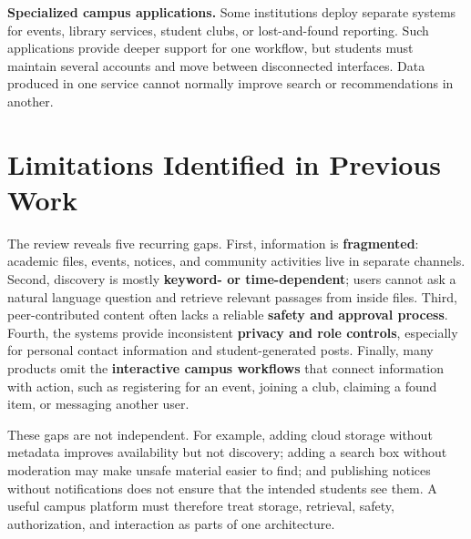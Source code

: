 \documentclass[12pt,a4paper]{report}
\begin{document}
\textbf{Specialized campus applications.} Some institutions deploy
separate systems for events, library services, student clubs, or
lost-and-found reporting. Such applications provide deeper support
for one workflow, but students must maintain several accounts and
move between disconnected interfaces. Data produced in one service
cannot normally improve search or recommendations in another.

\section{Limitations Identified in Previous Work}
The review reveals five recurring gaps. First, information is
\textbf{fragmented}: academic files, events, notices, and community
activities live in separate channels. Second, discovery is mostly
\textbf{keyword- or time-dependent}; users cannot ask a natural
language question and retrieve relevant passages from inside files.
Third, peer-contributed content often lacks a reliable
\textbf{safety and approval process}. Fourth, the systems provide
inconsistent \textbf{privacy and role controls}, especially for
personal contact information and student-generated posts. Finally,
many products omit the \textbf{interactive campus workflows} that
connect information with action, such as registering for an event,
joining a club, claiming a found item, or messaging another user.

These gaps are not independent. For example, adding cloud storage
without metadata improves availability but not discovery; adding a
search box without moderation may make unsafe material easier to
find; and publishing notices without notifications does not ensure
that the intended students see them. A useful campus platform must
therefore treat storage, retrieval, safety, authorization, and
interaction as parts of one architecture.
\end{document}
